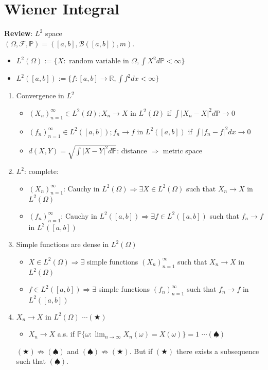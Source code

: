 \documentclass[12pt]{report}
\renewcommand{\P}{\mathbb{P}}
\newcommand{\F}{\mathcal{F}}
\renewcommand{\1}{\mathbb{1}}
\renewcommand{\O}{\Omega}
\theoremstyle{break}
\theoremstyle{newdef}
\theoremstyle{remark}
\begin{document}
\setcounter{chapter}{2}
\setcounter{section}{2}
\section{Wiener Integral}


\textbf{Review}: $L^2$ space\\
$(\O,\F,\P) = ([a,b], \mathcal{B}([a,b]), m)$.
\begin{itemize}
\item $L^2(\O) := \{ X : \text{ random variable in } \O, \int X^2 d\P < \infty \}$
\item $L^2([a,b]) := \{ f : [a,b] \rightarrow \mathbb{R}, \int f^2 dx < \infty \}$
\end{itemize}

\begin{enumerate}[wide]
\item Convergence in $L^2$
\begin{itemize}
\item $(X_n)_{n=1}^\infty \in L^2(\O); X_n \rightarrow X$ in $L^2(\O)$ if $\int|X_n-X|^2 d\P \rightarrow 0$
\item $(f_n)_{n=1}^\infty \in L^2([a,b]); f_n \rightarrow f$ in $L^2([a,b])$ if $\int|f_n-f|^2 dx \rightarrow 0$
\item $d(X,Y) = \sqrt{\int |X-Y|^2 d\P}$: distance $\Rightarrow$ metric space
\end{itemize}

\item $L^2$: complete:
\begin{itemize}
\item $(X_n)_{n=1}^\infty$: Cauchy in $L^2(\O) \Longrightarrow \exists X \in L^2(\O)$ such that $X_n \rightarrow X$ in $L^2(\O)$
\item $(f_n)_{n=1}^\infty$: Cauchy in $L^2([a,b]) \Longrightarrow \exists f \in L^2([a,b])$ such that $f_n \rightarrow f$ in $L^2([a,b])$
\end{itemize}

\item Simple functions are dense in $L^2(\O)$
\begin{itemize}
\item $X \in L^2(\O) \Rightarrow \exists$ simple functions $(X_n)_{n=1}^\infty$ such that $X_n \rightarrow X$ in $L^2(\O)$
\item $f \in L^2([a,b]) \Rightarrow \exists$ simple functions $(f_n)_{n=1}^\infty$ such that $f_n \rightarrow f$ in $L^2([a,b])$
\end{itemize}

\item $X_n \rightarrow X$ in $L^2(\O)$ $\cdots (\bigstar)$
\begin{itemize}
\item $X_n \rightarrow X$ a.s. if $\P\{\omega:\lim_{n\rightarrow\infty} X_n(\omega) = X(\omega)\} = 1$ $\cdots 	(\spadesuit)$
\end{itemize}
$(\bigstar) \not\Rightarrow (\spadesuit)$ and $(\spadesuit) \not\Rightarrow (\bigstar)$.
But if $(\bigstar)$ there exists a subsequence such that $(\spadesuit)$.
\end{enumerate}
\end{document}
